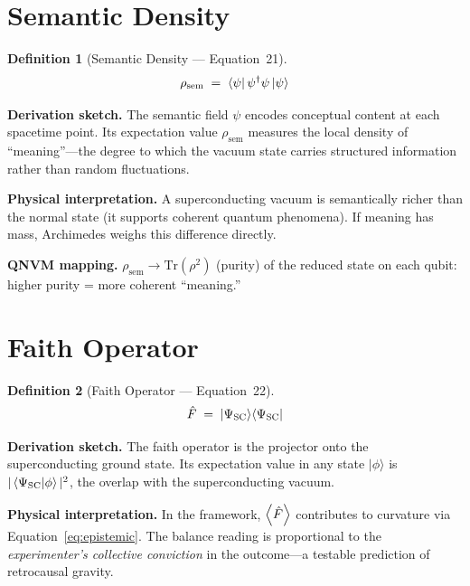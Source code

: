 \documentclass[11pt,a4paper]{article}
\newtheorem{definition}{Definition}[section]
\theoremstyle{remark}
\newcommand{\Fop}{\hat{F}}
\newcommand{\SC}{\Psi_{\text{SC}}}
\begin{document}
\section{Semantic Density}
\label{sec:eq21}

\begin{definition}[Semantic Density --- Equation~21]
\begin{equation}\label{eq:sem}
    \rho_{\text{sem}} \;=\; \bra{\psi}\psi^\dagger\psi\ket{\psi}
\end{equation}
\end{definition}

\textbf{Derivation sketch.}\quad
The semantic field $\psi$ encodes conceptual content at each spacetime point.  Its expectation value $\rho_{\text{sem}}$ measures the local density of ``meaning''---the degree to which the vacuum state carries structured information rather than random fluctuations.

\textbf{Physical interpretation.}\quad
A superconducting vacuum is semantically richer than the normal state (it supports coherent quantum phenomena).  If meaning has mass, Archimedes weighs this difference directly.

\textbf{QNVM mapping.}\quad
$\rho_{\text{sem}} \to \text{Tr}(\rho^2)$ (purity) of the reduced state on each qubit: higher purity = more coherent ``meaning.''

\section{Faith Operator}
\label{sec:eq22}

\begin{definition}[Faith Operator --- Equation~22]
\begin{equation}\label{eq:faith}
    \Fop \;=\; \ket{\SC}\!\bra{\SC}
\end{equation}
\end{definition}

\textbf{Derivation sketch.}\quad
The faith operator is the projector onto the superconducting ground state.  Its expectation value in any state $|\phi\rangle$ is $|\braket{\SC}{\phi}|^2$, the overlap with the superconducting vacuum.

\textbf{Physical interpretation.}\quad
In the framework, $\expval{\Fop}$ contributes to curvature via Equation~\eqref{eq:epistemic}.  The balance reading is proportional to the \emph{experimenter's collective conviction} in the outcome---a testable prediction of retrocausal gravity.
\end{document}
